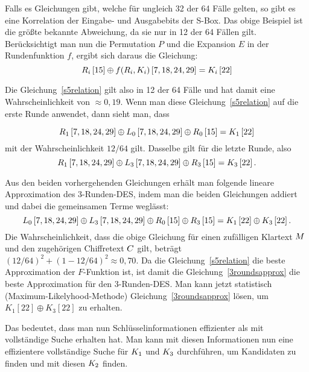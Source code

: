 Falls es Gleichungen gibt, welche für ungleich 32 der 64 Fälle gelten, so gibt es eine Korrelation der Eingabe- und Ausgabebits der S-Box. Das obige Beispiel ist die größte bekannte Abweichung, da sie nur in 12 der 64 Fällen gilt. Berücksichtigt man nun die Permutation $P$ und die Expansion $E$ in der Rundenfunktion $f$, ergibt sich daraus die Gleichung:
\begin{equation}
	R_i\left[ 15\right] \oplus f(R_i,K_i)\left[ 7,18,24,29\right] = K_i\left[ 22\right]
	\label{s5relation}
\end{equation}

Die Gleichung~\ref{s5relation} gilt also in 12 der 64 Fälle und hat damit eine Wahrscheinlichkeit von $\approx 0,19$. Wenn man diese Gleichung~\ref{s5relation}
auf die erste Runde anwendet, dann sieht man, dass

\begin{equation}
	R_1\left[ 7,18,24,29\right] \oplus L_0\left[ 7,18,24,29\right] \oplus R_0\left[ 15 \right] = K_1 \left[ 22 \right]
\end{equation}
mit der Wahrscheinlichkeit $12/64$ gilt. Dasselbe gilt für die letzte Runde, also
\begin{equation}
	R_1\left[ 7,18,24,29\right] \oplus L_3\left[ 7,18,24,29\right] \oplus R_3\left[ 15 \right] = K_3 \left[ 22 \right].
\end{equation}

Aus den beiden vorhergehenden Gleichungen erhält man folgende lineare Approximation des 3-Runden-DES, indem man die beiden Gleichungen addiert und dabei die gemeinsamen Terme weglässt:
\begin{equation}
	L_0\left[ 7,18,24,29\right] \oplus L_3\left[ 7,18,24,29\right] \oplus R_0\left[ 15 \right] \oplus R_3\left[ 15 \right] = K_1 \left[ 22 \right] \oplus K_3\left[ 22 \right].
	\label{3roundsapprox}
\end{equation}
Die Wahrscheinlichkeit, dass die obige Gleichung für einen zufälligen Klartext $M$ und den zugehörigen Chiffretext $C$ gilt, beträgt
$(12/64)^2+(1-12/64)^2 \approx 0,70$. Da die Gleichung~\ref{s5relation} die beste Approximation der $F$-Funktion ist, ist damit die
Gleichung~\ref{3roundsapprox} die beste Approximation für den 3-Runden-DES. Man kann jetzt statistisch (Maximum-Likelyhood-Methode)
Gleichung~\ref{3roundsapprox} lösen, um $K_1\left[ 22\right] \oplus K_3\left[ 22\right]$ zu erhalten.

Das bedeutet, dass man nun Schlüsselinformationen effizienter als mit vollständige Suche erhalten hat. Man kann mit diesen Informationen nun eine effizientere vollständige Suche für $K_1$ und $K_3$ durchführen, um Kandidaten zu finden und mit diesen $K_2$ finden.


